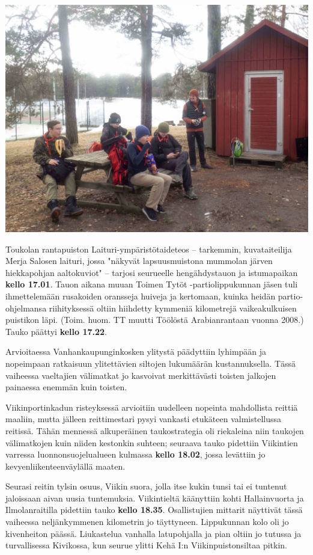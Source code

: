 \begin{multicols}{2}
	\noindent\includegraphics[width=\linewidth]{assets/nahkaliljamustikkamaa}

	Toukolan rantapuiston Laituri-ympäristötaideteos – tarkemmin,
	kuvataiteilija Merja Salosen laituri, jossa "näkyvät lapsuusmuistona
	mummolan järven hiekkapohjan aaltokuviot" – tarjosi seurueelle
	hengähdystauon ja istumapaikan \textbf{kello 17.01}. Tauon aikana muuan
	Toimen Tytöt -partiolippukunnan jäsen tuli ihmettelemään rusakoiden
	oransseja huiveja ja kertomaan, kuinka heidän partio-ohjelmansa
	riihityksessä oltiin hiihdetty kymmeniä kilometrejä vaikeakulkuisen
	puistikon läpi. (Toim. huom. TT muutti Töölöstä Arabianrantaan vuonna
	2008.) Tauko päättyi \textbf{kello 17.22}.

	Arvioitaessa Vanhankaupunginkosken ylitystä päädyttiin lyhimpään ja
	nopeimpaan ratkaisuun ylitettävien siltojen lukumäärän kustannuksella.
	Tässä vaiheessa vaeltajien välimatkat jo kasvoivat merkittävästi
	toisten jalkojen painaessa enemmän kuin toisten.

	Viikinportinkadun risteyksessä arvioitiin uudelleen nopeinta
	mahdollista reittiä maaliin, mutta jälleen reittimestari pysyi vankasti
	etukäteen valmistellussa reitissä. Tähän mennessä alkuperäinen
	taukostrategia oli riekaleina niin taukojen välimatkojen kuin niiden
	kestonkin suhteen; seuraava tauko pidettiin Viikintien varressa
	luonnonsuojelualueen kulmassa \textbf{kello 18.02}, jossa levättiin jo
	kevyenliikenteenväylällä maaten.

	Seurasi reitin tylsin osuus, Viikin suora, jolla itse kukin tunsi tai
	ei tuntenut jaloissaan aivan uusia tuntemuksia. Viikintieltä käänyttiin
	kohti Hallainvuorta ja Ilmolanraitilla pidettiin tauko \textbf{kello
	18.35}. Osallistujien mittarit näyttivät tässä vaiheessa neljänkymmenen
	kilometrin jo täyttyneen. Lippukunnan kolo oli jo kivenheiton päässä.
	Liukastelua vanhalla latupohjalla ja pian oltiin jo tutussa ja
	turvallisessa Kivikossa, kun seurue ylitti Kehä I:n Viikinpuistonsiltaa
	pitkin.


\end{multicols}
